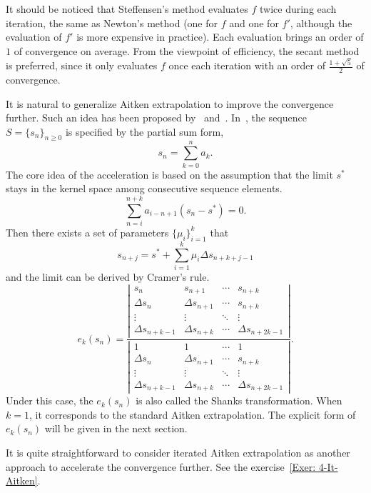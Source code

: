 \begin{remark}
    It should be noticed that Steffensen's method evaluates $f$ twice during each iteration, the same as Newton's method (one for $f$ and one for $f'$, although the evaluation of $f'$ is more expensive in practice). Each evaluation brings an order of $1$ of convergence on average. From the viewpoint of efficiency, the secant method is preferred, since it only evaluates $f$ once each iteration with an order of $\frac{1+\sqrt{5}}{2}$ of convergence. 
\end{remark}
It is natural to generalize Aitken extrapolation to improve the convergence further. Such an idea has been proposed by~\cite{schmidt1941xxxii} and~\cite{shanks1955non}. In~\cite{shanks1955non}, the sequence $S = \{s_n\}_{n\ge 0}$ is specified by the partial sum form,
\begin{equation}
    s_n = \sum_{k=0}^n a_k. 
\end{equation}
The core idea of the acceleration is based on the assumption that the limit $s^{\ast}$ stays in the kernel space among consecutive sequence elements. $$ \sum_{n=i}^{n+k} a_{i - n + 1} ( s_n -  s^{\ast} ) = 0.$$ Then there exists a set of parameters $\{ \mu_i \}_{i=1}^k $ that 
\begin{equation}
    s_{n+j} = s^{\ast} + \sum_{i=1}^k \mu_i \Delta s_{n+k+j-1}
\end{equation}
and the limit can be derived by Cramer's rule.
\begin{equation}
    e_k(s_n) = \frac{\left|\begin{matrix}
        s_n & s_{n+1} & \cdots & s_{n+k} \\
        \Delta s_{n} & \Delta s_{n+1} & \cdots & s_{n+k} \\
        \vdots & \vdots & \ddots & \vdots \\
        \Delta s_{n+k-1} & \Delta s_{n+k} & \cdots & \Delta s_{n+2k-1}
    \end{matrix} \right|}{\left|     
    \begin{matrix}
      1 & 1 & \cdots & 1 \\
        \Delta s_{n} & \Delta s_{n+1} & \cdots & s_{n+k} \\
        \vdots & \vdots & \ddots & \vdots \\
        \Delta s_{n+k-1} & \Delta s_{n+k} & \cdots & \Delta s_{n+2k-1}      
    \end{matrix}
\right|}.
\end{equation}
Under this case, the $ e_k(s_n) $ is also called the Shanks transformation. When $k=1$, it corresponds to the standard Aitken extrapolation. The explicit form of $ e_k(s_n) $ will be given in the next section.
\begin{remark}
    It is quite straightforward to consider iterated Aitken extrapolation as another approach to accelerate the convergence further. See the exercise~\ref{Exer: 4-It-Aitken}. 
\end{remark}
